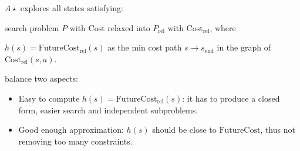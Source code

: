  $A\star$ explores all states satisfying:

 search problem $P$ with $\text{Cost}$ relaxed
into $P_\text{rel}$ with $\text{Cost}_\text{rel}$, where

 $h(s) = \text{FutureCost}_\text{rel}(s)$ as the min cost
path $s \rightarrow s_{\text{end}}$ in the graph of
$\text{Cost}_\text{rel}(s,a)$.

 balance two aspects:
\begin{itemize}
    \item Easy to compute $h(s) = \text{FutureCost}_\text{rel}(s)$: it has to
        produce a closed form, easier search and independent subproblems.
    \item Good enough approximation: $h(s)$ should be close to
        $\text{FutureCost}$, thus not removing too many constraints.
\end{itemize}